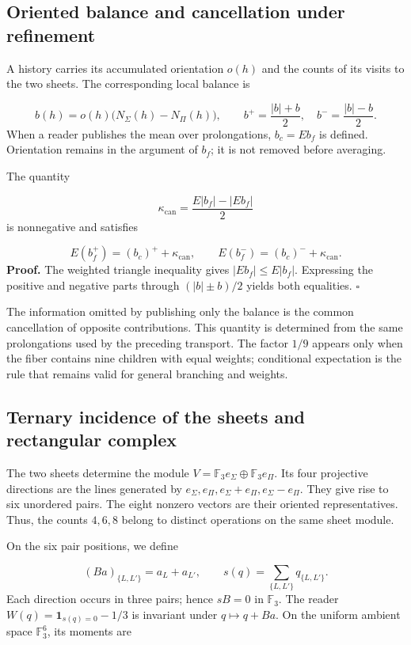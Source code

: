 \subsection{Oriented balance and cancellation under refinement}
A history carries its accumulated orientation \(o(h)\) and the counts of its visits to the two sheets. The corresponding local balance is

\[
b(h)=o(h)\bigl(N_\Sigma(h)-N_\Pi(h)\bigr),
\qquad
b^+=\frac{|b|+b}{2},\quad b^-=\frac{|b|-b}{2}.
\]
When a reader publishes the mean over prolongations, \(b_c=Eb_f\) is defined. Orientation remains in the argument of \(b_f\); it is not removed before averaging.

The quantity

\[
\kappa_{\mathrm{can}}=
\frac{E|b_f|-|Eb_f|}{2}
\]
is nonnegative and satisfies

\[
E(b_f^+)=(b_c)^++\kappa_{\mathrm{can}},
\qquad
E(b_f^-)=(b_c)^-+\kappa_{\mathrm{can}}.
\]
\textbf{Proof.} The weighted triangle inequality gives \(|Eb_f|\leq E|b_f|\). Expressing the positive and negative parts through \((|b|\pm b)/2\) yields both equalities. \hfill\(\square\)

The information omitted by publishing only the balance is the common cancellation of opposite contributions. This quantity is determined from the same prolongations used by the preceding transport. The factor \(1/9\) appears only when the fiber contains nine children with equal weights; conditional expectation is the rule that remains valid for general branching and weights.

\subsection{Ternary incidence of the sheets and rectangular complex}
The two sheets determine the module \(V=\mathbb F_3e_\Sigma\oplus\mathbb F_3e_\Pi\). Its four projective directions are the lines generated by \(e_\Sigma,e_\Pi,e_\Sigma+e_\Pi,e_\Sigma-e_\Pi\). They give rise to six unordered pairs. The eight nonzero vectors are their oriented representatives. Thus, the counts \(4,6,8\) belong to distinct operations on the same sheet module.

On the six pair positions, we define

\[
(Ba)_{\{L,L'\}}=a_L+a_{L'},
\qquad
s(q)=\sum_{\{L,L'\}}q_{\{L,L'\}}.
\]
Each direction occurs in three pairs; hence \(sB=0\) in \(\mathbb F_3\). The reader \(W(q)=\mathbf1_{s(q)=0}-1/3\) is invariant under \(q\mapsto q+Ba\). On the uniform ambient space \(\mathbb F_3^6\), its moments are

